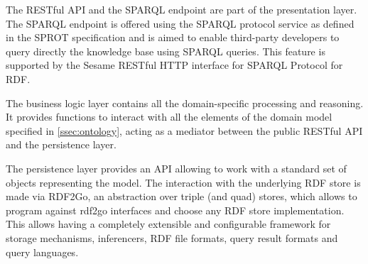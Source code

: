 The RESTful API and the SPARQL endpoint are part of the presentation layer. The SPARQL endpoint is offered using the SPARQL protocol service as defined in the SPROT specification \cite{sprot} and is aimed to enable third-party developers to query directly the knowledge base using SPARQL queries. This feature is supported by the Sesame RESTful HTTP interface for SPARQL Protocol for RDF.

The business logic layer contains all the domain-specific processing and reasoning. It provides functions to interact with all the elements of the domain model specified in \ref{ssec:ontology},
acting as a mediator between the public RESTful API and the persistence layer.

The persistence layer provides an API allowing to work with a standard set of objects representing the model. The interaction with the underlying RDF store is made via RDF2Go, an abstraction over triple (and quad) stores, which allows to program against rdf2go interfaces and choose any RDF store implementation. This allows having a completely extensible and configurable framework for storage mechanisms, inferencers, RDF file formats, query result formats and query languages.




